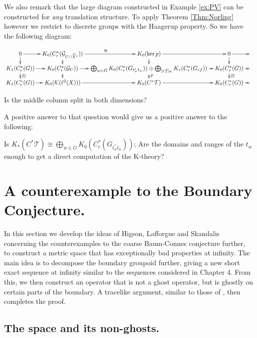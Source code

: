 \begin{example}
We also remark that the large diagram constructed in Example \ref{ex:PV} can be constructed for \textit{any} translation structure. To apply Theorem \ref{Thm:Norling} however we restrict to discrete groups with the Haagerup property. So we have the following diagram:

$$
\xymatrix@=0.7em{ 0 \ar[r]\ar[d] & K_{0}(C^{*}_{r}(\G_{U\cap \widehat{X}^{c}}))\ar[d] \ar[r]^{\cong}& K_{0}(\ker p) \ar[r]\ar[d]& 0 \ar[r]\ar[d] & \\
K_{1}(C^{*}_{r}(G)) \ar[r]\ar[d]^{\ucong} & K_{0}(C^{*}_{r}(\G_{U}))\ar[r]\ar[d]&\bigoplus_{w \in G} K_{0}(C^{*}_{r}(G_{t_{w}^{*}t_{w}})) \oplus \bigoplus_{[ef]_{\approx}} K_{*}(C^{*}_{r}(G_{ef}))\ar[r]\ar[d]^{p}& K_{0}(C^{*}_{r}(G))\ar[r]\ar[d]^{\ucong} &  \\
K_{1}(C^{*}_{r}(G)) \ar[r]& K_{0}(\mathcal{K}(\ell^{2}(X))) \ar[r]& K_{0}(C^{*}\mathcal{T}) \ar[r]& K_{0}(C^{*}_{r}(G)) \ar[r]&  
}
$$

\begin{question}
Is the middle column split in both dimensions?
\end{question}

A positive answer to that question would give us a positive answer to the following:

\begin{question}
Is $K_{*}(C^{*}\mathcal{T}) \cong \bigoplus_{w \in G} K_{0}(C^{*}_{r}(G_{t_{w}^{*}t_{w}}))$; Are the domains and ranges of the $t_{w}$ enough to get a direct computation of the K-theory?
\end{question}

\section{A counterexample to the Boundary Conjecture.}
In this section we develop the ideas of Higson, Lafforgue and Skandalis concerning the counterexamples to the coarse Baum-Connes conjecture further, to construct a metric space that has exceptionally bad properties at infinity. The main idea is to decompose the boundary groupoid further, giving a new short exact sequence at infinity similar to the sequences considered in Chapter 4. From this, we then construct an operator that is not a ghost operator, but is ghostly on certain parts of the boundary. A tracelike argument, similar to those of \cite{higsonpreprint, explg1}, then completes the proof.

\subsection{The space and its non-ghosts.}


\end{example}
